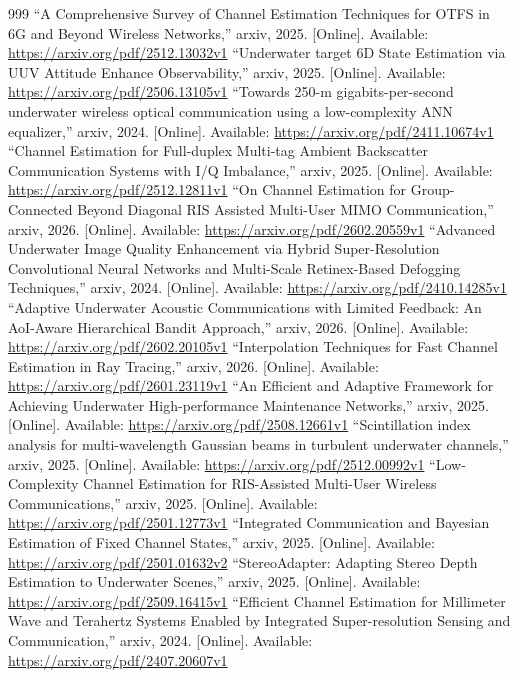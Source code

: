 \documentclass[10pt,journal]{IEEEtran}
\begin{document}
\begin{thebibliography}{999}
 ``A Comprehensive Survey of Channel Estimation Techniques for OTFS in 6G and Beyond Wireless Networks,'' arxiv, 2025. [Online]. Available: \url{https://arxiv.org/pdf/2512.13032v1}
 ``Underwater target 6D State Estimation via UUV Attitude Enhance Observability,'' arxiv, 2025. [Online]. Available: \url{https://arxiv.org/pdf/2506.13105v1}
 ``Towards 250-m gigabits-per-second underwater wireless optical communication using a low-complexity ANN equalizer,'' arxiv, 2024. [Online]. Available: \url{https://arxiv.org/pdf/2411.10674v1}
 ``Channel Estimation for Full-duplex Multi-tag Ambient Backscatter Communication Systems with I/Q Imbalance,'' arxiv, 2025. [Online]. Available: \url{https://arxiv.org/pdf/2512.12811v1}
 ``On Channel Estimation for Group-Connected Beyond Diagonal RIS Assisted Multi-User MIMO Communication,'' arxiv, 2026. [Online]. Available: \url{https://arxiv.org/pdf/2602.20559v1}
 ``Advanced Underwater Image Quality Enhancement via Hybrid Super-Resolution Convolutional Neural Networks and Multi-Scale Retinex-Based Defogging Techniques,'' arxiv, 2024. [Online]. Available: \url{https://arxiv.org/pdf/2410.14285v1}
 ``Adaptive Underwater Acoustic Communications with Limited Feedback: An AoI-Aware Hierarchical Bandit Approach,'' arxiv, 2026. [Online]. Available: \url{https://arxiv.org/pdf/2602.20105v1}
 ``Interpolation Techniques for Fast Channel Estimation in Ray Tracing,'' arxiv, 2026. [Online]. Available: \url{https://arxiv.org/pdf/2601.23119v1}
 ``An Efficient and Adaptive Framework for Achieving Underwater High-performance Maintenance Networks,'' arxiv, 2025. [Online]. Available: \url{https://arxiv.org/pdf/2508.12661v1}
 ``Scintillation index analysis for multi-wavelength Gaussian beams in turbulent underwater channels,'' arxiv, 2025. [Online]. Available: \url{https://arxiv.org/pdf/2512.00992v1}
 ``Low-Complexity Channel Estimation for RIS-Assisted Multi-User Wireless Communications,'' arxiv, 2025. [Online]. Available: \url{https://arxiv.org/pdf/2501.12773v1}
 ``Integrated Communication and Bayesian Estimation of Fixed Channel States,'' arxiv, 2025. [Online]. Available: \url{https://arxiv.org/pdf/2501.01632v2}
 ``StereoAdapter: Adapting Stereo Depth Estimation to Underwater Scenes,'' arxiv, 2025. [Online]. Available: \url{https://arxiv.org/pdf/2509.16415v1}
 ``Efficient Channel Estimation for Millimeter Wave and Terahertz Systems Enabled by Integrated Super-resolution Sensing and Communication,'' arxiv, 2024. [Online]. Available: \url{https://arxiv.org/pdf/2407.20607v1}

\end{thebibliography}
\end{document}

